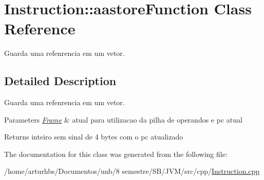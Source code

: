 \hypertarget{classInstruction_1_1aastoreFunction}{}\section{Instruction\+:\+:aastore\+Function Class Reference}
\label{classInstruction_1_1aastoreFunction}


Guarda uma refenrencia em um vetor.  




\subsection{Detailed Description}
Guarda uma refenrencia em um vetor. 


\begin{DoxyParams}{Parameters}
{\em \hyperlink{classFrame}{Frame}} & atual para utilizacao da pilha de operandos e pc atual \\
\hline
\end{DoxyParams}
\begin{DoxyReturn}{Returns}
inteiro sem sinal de 4 bytes com o pc atualizado 
\end{DoxyReturn}


The documentation for this class was generated from the following file\+:\begin{DoxyCompactItemize}
\item 
/home/arturhbs/\+Documentos/unb/8 semestre/\+S\+B/\+J\+V\+M/src/cpp/\hyperlink{Instruction_8cpp}{Instruction.\+cpp}\end{DoxyCompactItemize}
